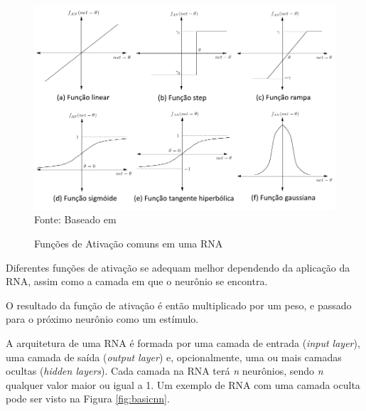 \documentclass[
	12pt,					%
	openright,				%
	oneside,				%
	a4paper,				%
	bibjustif,				%
	chapter=TITLE,			%
	english,				%
	brazil,					%
	]{abntex2}
\newcommand{\source}[1]{\small Fonte: {#1}}
\begin{document}
	\begin{figure}[ht!]
		\caption{Funções de Ativação comuns em uma RNA}
		\centering
		\includegraphics[scale=0.48]{img/ActivationFunctions.png}\\
		\vspace{0.5mm}
		\source{Baseado em }
		\label{fig:activationFunctions}
	\end{figure}
	
	Diferentes funções de ativação se adequam melhor dependendo da aplicação da RNA,
	assim como a camada em que o neurônio se encontra.
	
	O resultado da função de ativação é então multiplicado por um peso,
	e passado para o próximo neurônio como um estímulo. \cite{bookAI-ANNdefinition}
	
	A arquitetura de uma RNA é formada por uma camada de entrada (\textit{input layer}),
	uma camada de saída (\textit{output layer})
	e, opcionalmente, uma ou mais camadas ocultas (\textit{hidden layers}).
	Cada camada na RNA terá \textit{n} neurônios,
	sendo \textit{n} qualquer valor maior ou igual a 1.
	Um exemplo de RNA com uma camada oculta pode ser visto na Figura \ref{fig:basicnn}.
	
\end{document}
